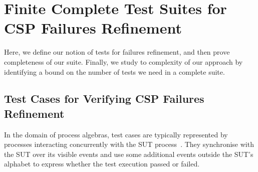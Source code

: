 \section{Finite Complete Test Suites for CSP Failures Refinement}
\label{sec:finitecompletefails}

Here, we define our notion of tests for failures refinement, and then prove
completeness of our suite. Finally, we study to complexity of our approach by
identifying a bound on the number of tests we need in a complete suite.

\subsection{Test Cases for Verifying CSP Failures Refinement}

In the domain of process algebras, test cases are typically represented
by processes interacting concurrently with the SUT
process~\cite{Hennessy:1988:ATP:50497}. They synchronise with the SUT over its visible events and use some additional events outside the SUT's alphabet to express whether the test execution  passed or failed. %

